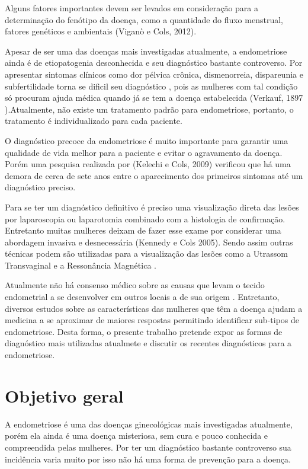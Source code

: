\documentclass[12pt]{article} %
\begin{document}
Alguns fatores importantes devem ser levados em consideração para a determinação do fenótipo da doença, como a quantidade do fluxo menstrual, fatores genéticos e ambientais (Viganò e Cols, 2012).

Apesar de ser uma das doenças mais investigadas atualmente, a endometriose ainda é de etiopatogenia desconhecida e seu diagnóstico bastante controverso.  Por apresentar sintomas clínicos como dor pélvica crônica, dismenorreia, dispareunia e subfertilidade torna se dificil seu diagnóstico , pois as mulheres com tal condição só procuram ajuda médica quando já se tem a doença estabelecida (Verkauf, 1897 ).Atualmente, não existe um tratamento padrão para endometriose, portanto, o tratamento é individualizado para cada paciente.

O diagnóstico precoce da endometriose é muito importante para garantir uma qualidade de vida melhor para a paciente e evitar o agravamento da doença. Porém uma pesquisa realizada por (Kelechi e Cols, 2009) verificou que há uma demora de cerca de sete  anos entre o aparecimento dos primeiros sintomas até um diagnóstico preciso.

Para se ter um diagnóstico definitivo é preciso uma visualização direta das lesões por laparoscopia ou laparotomia combinado com a histologia de confirmação. Entretanto muitas mulheres deixam de fazer esse exame por considerar uma abordagem invasiva e desnecessária (Kennedy e Cols 2005).
Sendo assim outras técnicas podem são utilizadas para a visualização das lesões como a Utrassom Transvaginal e a Ressonância Magnética .

Atualmente não há consenso médico sobre as causas que levam o tecido endometrial a se desenvolver em outros locais a de sua origem . Entretanto, diversos estudos sobre as características das mulheres que têm a doença ajudam a medicina a se aproximar de maiores respostas permitindo identificar sub-tipos de endometriose. Desta forma, o presente trabalho pretende expor as formas de diagnóstico mais utilizadas atualmete e discutir os recentes diagnósticos para a endometriose.

\section{Objetivo geral}

A endometriose é uma das doenças ginecológicas mais investigadas atualmente, porém ela ainda é uma doença misteriosa, sem cura e pouco conhecida e compreendida pelas mulheres.
Por ter um diagnóstico bastante controverso sua incidência varia muito por isso não há uma forma de prevenção para a doença.
\end{document}
